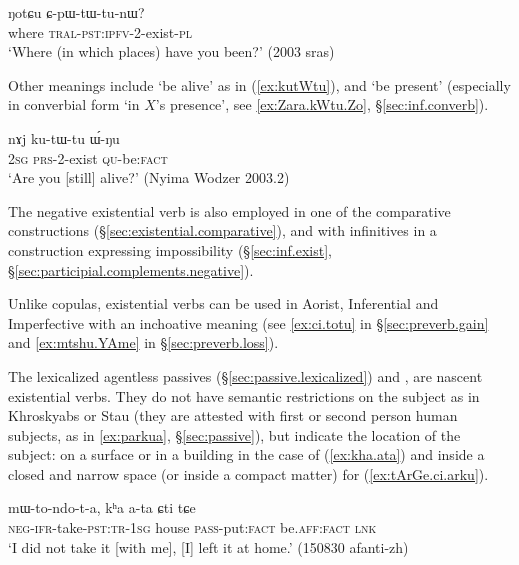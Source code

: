  \begin{exe}
\ex \label{ex:NotCu.CpWtWtunW}
\gll  ŋotɕu ɕ-pɯ-tɯ-tu-nɯ? \\
where \textsc{tral}-\textsc{pst}:\textsc{ipfv}-2-exist-\textsc{pl} \\
\glt `Where (in which places) have you been?' (2003 sras)
\end{exe} 

Other meanings include `be alive' as in (\ref{ex:kutWtu}), and `be present' (especially in converbial form  `in $X$'s presence', see \ref{ex:Zara.kWtu.Zo}, §\ref{sec:inf.converb}). 

\begin{exe}
\ex \label{ex:kutWtu}
\gll  nɤj ku-tɯ-tu ɯ́-ŋu \\
\textsc{2sg} \textsc{prs}-2-exist \textsc{qu}-be:\textsc{fact} \\
\glt `Are you [still] alive?' (Nyima Wodzer 2003.2)
\end{exe} 

The negative existential verb  is also employed in one of the comparative constructions (§\ref{sec:existential.comparative}), and with infinitives in a construction expressing impossibility (§\ref{sec:inf.exist}, §\ref{sec:participial.complements.negative}).

Unlike copulas, existential verbs can be used in Aorist, Inferential and Imperfective with an inchoative meaning (see  \ref{ex:ci.totu} in §\ref{sec:preverb.gain} and \ref{ex:mtshu.YAme} in §\ref{sec:preverb.loss}).
 
The lexicalized agentless passives (§\ref{sec:passive.lexicalized})   and , are nascent existential verbs. They do not have semantic restrictions on the subject as in Khroskyabs or Stau (they are attested with first or second person human subjects, as in \ref{ex:parkua}, §\ref{sec:passive}), but indicate the location of the subject: on a surface or in a building in the case of  (\ref{ex:kha.ata}) and inside a closed and narrow space (or inside a compact matter) for  (\ref{ex:tArGe.ci.arku}).
 
\begin{exe}
\ex \label{ex:kha.ata}
\gll  mɯ-to-ndo-t-a, kʰa a-ta ɕti tɕe \\
\textsc{neg}-\textsc{ifr}-take-\textsc{pst}:\textsc{tr}-\textsc{1sg} house \textsc{pass}-put:\textsc{fact} be.\textsc{aff}:\textsc{fact} \textsc{lnk} \\
\glt `I did not take it [with me], [I] left it at home.' (150830 afanti-zh)
 \end{exe}
  
